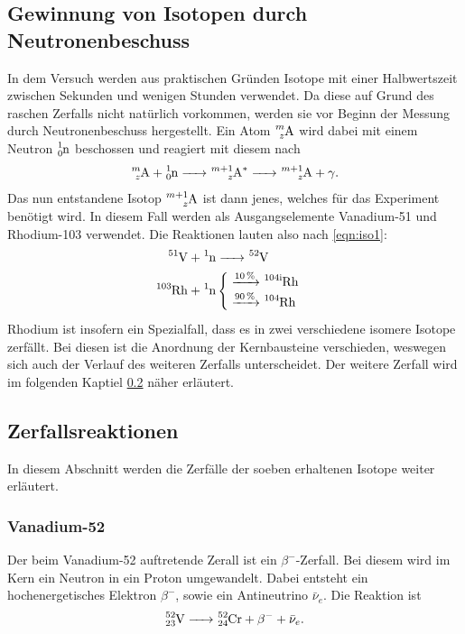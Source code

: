 \subsection{Gewinnung von Isotopen durch Neutronenbeschuss}
\label{sec:Neutronenbeschuss}
In dem Versuch werden aus praktischen Gründen Isotope mit einer Halbwertszeit zwischen Sekunden und 
wenigen Stunden verwendet. Da diese auf Grund des raschen Zerfalls nicht natürlich vorkommen, werden 
sie vor Beginn der Messung durch Neutronenbeschuss hergestellt. Ein Atom $\ce{^{m}_{z}A}$ wird dabei 
mit einem Neutron $\ce{^{1}_{0}n}$ beschossen und reagiert mit diesem nach
\begin{equation}
    \ce{^{m}_{z}A}+\ce{^{1}_{0}n -> ^{m + 1}_{z}A^* -> ^{m + 1}_{z}A}+\gamma.
    \label{eqn:iso1}
\end{equation}
Das nun entstandene Isotop $\ce{^{m + 1}_{z}A}$ ist dann jenes, welches für das Experiment benötigt
wird. In diesem Fall werden als Ausgangselemente Vanadium-51 und Rhodium-103 verwendet. Die 
Reaktionen lauten also nach \ref{eqn:iso1}:
\begin{align*}
    \ce{^{51}V}+\ce{^{1}n&->^{52}V}\\
    \ce{^{103}Rh}+\ce{^{1}n}&
    \begin{cases}
        \ce{->[10\%]^{104 i}Rh}\\
        \ce{->[90\%]^{104}Rh}
    \end{cases}
\end{align*}
Rhodium ist insofern ein Spezialfall, dass es in zwei verschiedene isomere Isotope zerfällt. Bei diesen
ist die Anordnung der Kernbausteine verschieden, weswegen sich auch der Verlauf des weiteren Zerfalls
unterscheidet. Der weitere Zerfall wird im folgenden Kaptiel \ref{sec:Zerfallsreaktionen} näher erläutert. 
\subsection{Zerfallsreaktionen}
\label{sec:Zerfallsreaktionen}
In diesem Abschnitt werden die Zerfälle der soeben erhaltenen Isotope weiter erläutert.
\subsubsection*{Vanadium-52} 
Der beim Vanadium-52 auftretende Zerall ist ein $\beta^-$-Zerfall. Bei diesem wird im Kern ein Neutron
in ein Proton umgewandelt. Dabei entsteht ein hochenergetisches Elektron $\beta^-$, sowie ein 
Antineutrino $\bar{\nu}_e$. Die Reaktion ist
\begin{equation}
    \ce{^{52}_{23}V -> ^{52}_{24}Cr}+\beta^-+\bar{\nu}_e. 
    \label{eqn:VZerfall}
\end{equation}
